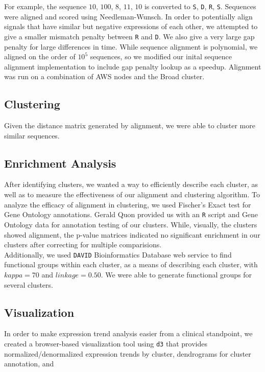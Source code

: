 \documentclass[aps,prd,final,onecolumn,a4paper,10pt]{revtex4}
\begin{document}
For example, the sequence $10$, $100$, $8$, $11$, $10$ is converted to \verb!S!, \verb!D!, \verb!R!, \verb!S!. Sequences were aligned and scored using Needleman-Wunsch.
In order to potentially align signals that have similar but negative expressions of each other, we attempted to give a smaller mismatch penalty between \verb!R! and \verb!D!.
We also give a very large gap penalty for large differences in time.
While sequence alignment is polynomial, we aligned on the order of $10^5$ sequences, so we modified our inital sequence alignment implementation to include gap penalty lookup as a speedup.
Alignment was run on a combination of AWS nodes and the Broad cluster.

\subsection{Clustering}

Given the distance matrix generated by alignment, we were able to cluster more similar sequences.



\subsection{Enrichment Analysis}
After identifying clusters, we wanted a way to efficiently describe each cluster, as well as to measure the effectiveness of our alignment and clustering algorithm.
To analyze the efficacy of alignment in clustering, we used Fischer's Exact test for Gene Ontology annotations.
Gerald Quon provided us with an \verb!R! script and Gene Ontology data for annotation testing of our clusters.
While, visually, the clusters showed alignment, the p-value matrices indicated no significant enrichment in our clusters after correcting for multiple comparisions.\\

Additionally, we used \verb!DAVID! Bioinformatics Database web service to find functional groups within each cluster, as a means of describing each cluster, with $kappa=70$ and $linkage = 0.50$. We were able to generate functional groups for several clusters.





\subsection{Visualization}
In order to make expression trend analysis easier from a clinical standpoint, we created a browser-based visualization tool using \verb!d3! that provides normalized/denormalized expression trends by cluster, dendrograms for cluster annotation, and 
\end{document}
